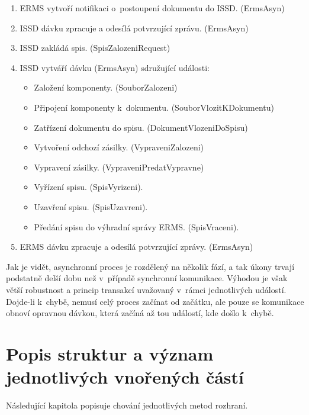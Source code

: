 \documentclass[
  master,
  field=ainfp,
  biblatex,
  language=czech,
  glossaries,
  theorems=false,
  index
]{kidiplom}
\begin{document}
\begin{enumerate}
	\item ERMS vytvoří notifikaci o~postoupení dokumentu do ISSD. (ErmsAsyn)
	\item ISSD dávku zpracuje a odesílá potvrzující zprávu. (ErmsAsyn)
	\item ISSD zakládá spis. (SpisZalozeniRequest)
	\item ISSD vytváří dávku (ErmsAsyn) sdružující události:
	\begin{itemize}
		\item Založení komponenty. (SouborZalozeni)
		\item Připojení komponenty k~dokumentu. (SouborVlozitKDokumentu)
		\item Zatřízení dokumentu do spisu. (DokumentVlozeniDoSpisu)
		\item Vytvoření odchozí zásilky. (VypraveniZalozeni)
		\item Vypravení zásilky. (VypraveniPredatVypravne)
		\item Vyřízení spisu. (SpisVyrizeni).
		\item Uzavření spisu. (SpisUzavreni).
		\item Předání spisu do výhradní správy ERMS. (SpisVraceni).
	\end{itemize}
	\item ERMS dávku zpracuje a odesílá potvrzující zprávy. (ErmsAsyn)
\end{enumerate}

Jak je vidět, asynchronní proces je rozdělený na několik fází, a tak úkony trvají podstatně delší dobu než v~případě synchronní komunikace. Výhodou je však větší robustnost a princip transakcí uvažovaný v~rámci jednotlivých událostí. Dojde-li k~chybě, nemusí celý proces začínat od začátku, ale pouze se komunikace obnoví opravnou dávkou, která začíná až tou událostí, kde došlo k~chybě.


\newpage
\section{Popis struktur a význam jednotlivých vnořených částí}
Následující kapitola popisuje chování jednotlivých metod rozhraní.
\end{document}
